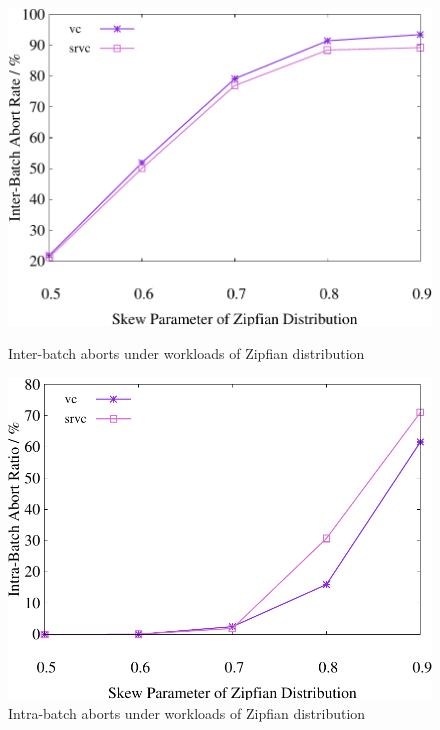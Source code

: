 \begin{figure}[t]
    \centering
    \begin{minipage}[b]{0.32\linewidth}
        \centering
        \includegraphics[width=\textwidth]{./exp_fig/basic/preabort}
        \vspace{-2em}
        \caption{Inter-batch aborts under workloads of Zipfian distribution}
        \label{fig:basic:preabort}
    \end{minipage}
    \begin{minipage}[b]{0.32\linewidth}
        \centering
        \includegraphics[width=\textwidth]{./exp_fig/basic/in_batch_abort}
        \vspace{-2em}
        \caption{Intra-batch aborts under workloads of Zipfian distribution}

\end{minipage}
\end{figure}

